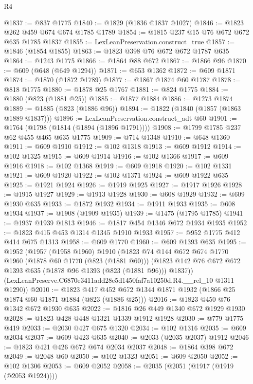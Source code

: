 \begin{lexlean}{R4}
\begin{coremodule}
@1837 := @837 @1775
@1840 := @1829 (@1836 @1837 @1027)
@1846 := @1823 @262 @459 @674 @674 @1785 @1789
@1854 := @1815 @237 @15 @76 @672 @672 @635 @1785 @1837
@1855 := LexLeanPreservation.construct_true
@1857 := @1846 (@1854 @1855)
@1863 := @1823 @398 @76 @672 @672 @1787 @635
@1864 := @1243 @1775
@1866 := @1864 @88 @672
@1867 := @1866 @96
@1870 := @609 (@648 (@649 @1294))
@1871 := @653 @1362
@1872 := @609 @1871
@1874 := @1870 (@1872 @1789)
@1877 := @1867 @1874 @60 @1787
@1878 := @818 @1775
@1880 := @1878 @25 @1767
@1881 := @824 @1775
@1884 := @1880 (@823 (@1881 @25))
@1885 := @1877 @1884
@1886 := @1273 @1874
@1889 := @1885 (@823 (@1886 @96))
@1894 := @1822 (@1840 (@1857 (@1863 @1889 @1837)))
@1896 := LexLeanPreservation.construct_adt @60
@1901 := @1764 (@1798 (@1814 (@1894 (@1896 @1791))))
@1908 := @1799 @1785 @237 @62 @455 @465 @635 @1775
@1909 := @714 @1348
@1910 := @648 @1360
@1911 := @609 @1910
@1912 := @102 @1318
@1913 := @609 @1912
@1914 := @102 @1325
@1915 := @609 @1914
@1916 := @102 @1366
@1917 := @609 @1916
@1918 := @102 @1368
@1919 := @609 @1918
@1920 := @102 @1331
@1921 := @609 @1920
@1922 := @102 @1371
@1924 := @609 @1922 @635
@1925 := @1921 @1924
@1926 := @1919 @1925
@1927 := @1917 @1926
@1928 := @1915 @1927
@1929 := @1913 @1928
@1930 := @608 @1929
@1932 := @609 @1930 @635
@1933 := @1872 @1932
@1934 := @1911 @1933
@1935 := @608 @1934
@1937 := @1908 (@1909 @1935)
@1939 := @1475 (@1795 @1785)
@1941 := @1937 @1939 @1813
@1946 := @1817 @454 @1346 @672 @1934 @1935
@1952 := @1823 @415 @453 @1314 @1345 @1910 @1933
@1957 := @952 @1775 @412 @414 @675 @1313
@1958 := @609 @1770
@1960 := @609 @1393 @635
@1995 := @1952
    (@1957
      (@1958 @1960)
      @1910
      (@1823
        @74
        @144
        @672
        @674
        @1770
        @1960
        (@1878 @60 @1770 (@823 (@1881 @60)))
        (@1823 @142 @76 @672 @672 @1393 @635 (@1878 @96 @1393 (@823 (@1881 @96))) @1837))
      (LexLeanPreserve.C6870e3411add28e5d1450faf7a10250d.R4.__rel_10 @1311 @1290))
@2010 := @1823 @417 @452 @672 @1344 @1871 @1932 (@1866 @25 @1874 @60 @1871 @1884 (@823 (@1886 @25)))
@2016 := @1823 @450 @76 @1342 @672 @1930 @635
@2022 := @1816 @26 @449 @1340 @672 @1929 @1930
@2028 := @1823 @428 @448 @1321 @1339 @1912 @1928
@2030 := @779 @1775 @419
@2033 := @2030 @427 @675 @1320
@2034 := @102 @1316
@2035 := @609 @2034
@2037 := @609 @423 @635
@2040 := @2033 (@2035 @2037) @1912
@2046 := @1823 @421 @426 @672 @674 @2034 @2037
@2048 := @1864 @398 @672
@2049 := @2048 @60
@2050 := @102 @1323
@2051 := @609 @2050
@2052 := @102 @1306
@2053 := @609 @2052
@2058 := @2035 (@2051 (@1917 (@1919 (@2053 @1924))))

\end{coremodule}
\end{lexlean}
